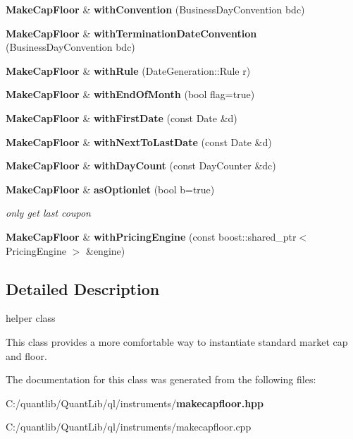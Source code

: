 \begin{DoxyCompactItemize}
\item 
{\bf Make\+Cap\+Floor} \& {\bfseries with\+Convention} (Business\+Day\+Convention bdc)\label{class_quant_lib_1_1_make_cap_floor_a62c66889cff5e8acd20b639f5fddc9b9}

\item 
{\bf Make\+Cap\+Floor} \& {\bfseries with\+Termination\+Date\+Convention} (Business\+Day\+Convention bdc)\label{class_quant_lib_1_1_make_cap_floor_aba808ccdc699efed7d0b30159c885e9f}

\item 
{\bf Make\+Cap\+Floor} \& {\bfseries with\+Rule} (Date\+Generation\+::\+Rule r)\label{class_quant_lib_1_1_make_cap_floor_a5eb0bbe27ffb2e46fdfc22f6374c2f3a}

\item 
{\bf Make\+Cap\+Floor} \& {\bfseries with\+End\+Of\+Month} (bool flag=true)\label{class_quant_lib_1_1_make_cap_floor_a29d8856bdbeb0961e5c1725df138c12a}

\item 
{\bf Make\+Cap\+Floor} \& {\bfseries with\+First\+Date} (const Date \&d)\label{class_quant_lib_1_1_make_cap_floor_ac72cc951122dbea0864c97b4d4ec8290}

\item 
{\bf Make\+Cap\+Floor} \& {\bfseries with\+Next\+To\+Last\+Date} (const Date \&d)\label{class_quant_lib_1_1_make_cap_floor_a6f6d9cff43be4c1b133aeb75d7cbfdb7}

\item 
{\bf Make\+Cap\+Floor} \& {\bfseries with\+Day\+Count} (const Day\+Counter \&dc)\label{class_quant_lib_1_1_make_cap_floor_a4cdd4f215935aba49379d614e1c3dcab}

\item 
{\bf Make\+Cap\+Floor} \& {\bf as\+Optionlet} (bool b=true)\label{class_quant_lib_1_1_make_cap_floor_a1700c4ccf8307f9680f492616a690533}

\begin{DoxyCompactList}\small\item\em only get last coupon \end{DoxyCompactList}\item 
{\bf Make\+Cap\+Floor} \& {\bfseries with\+Pricing\+Engine} (const boost\+::shared\+\_\+ptr$<$ Pricing\+Engine $>$ \&engine)\label{class_quant_lib_1_1_make_cap_floor_a657121037a06ce4b54f3ced46ac9654b}

\end{DoxyCompactItemize}


\subsection{Detailed Description}
helper class 

This class provides a more comfortable way to instantiate standard market cap and floor. 

The documentation for this class was generated from the following files\+:\begin{DoxyCompactItemize}
\item 
C\+:/quantlib/\+Quant\+Lib/ql/instruments/{\bf makecapfloor.\+hpp}\item 
C\+:/quantlib/\+Quant\+Lib/ql/instruments/makecapfloor.\+cpp\end{DoxyCompactItemize}

